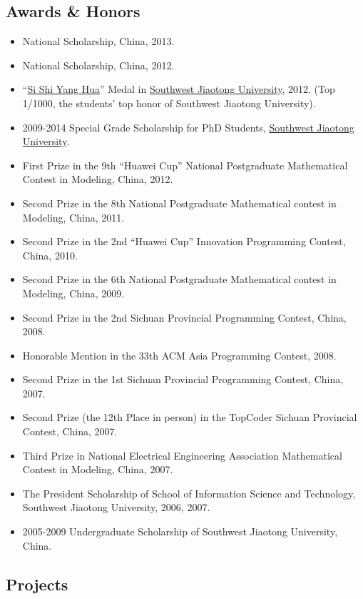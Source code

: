\documentclass[]{article}
\begin{document}
\subsection{Awards \& Honors}\label{awards-honors}

\begin{itemize}
\itemsep1pt\parskip0pt
\item
  National Scholarship, China, 2013.
\item
  National Scholarship, China, 2012.
\item
  ``\href{http://baike.baidu.com/view/644025.htm}{Si Shi Yang Hua}''
  Medal in \href{http://www.swjtu.edu.cn/}{Southwest Jiaotong
  University}, 2012. (Top 1/1000, the students' top honor of Southwest
  Jiaotong University).
\item
  2009-2014 Special Grade Scholarship for PhD Students,
  \href{http://www.swjtu.edu.cn/}{Southwest Jiaotong University}.
\item
  First Prize in the 9th ``Huawei Cup'' National Postgraduate
  Mathematical Contest in Modeling, China, 2012.
\item
  Second Prize in the 8th National Postgraduate Mathematical contest in
  Modeling, China, 2011.
\item
  Second Prize in the 2nd ``Huawei Cup'' Innovation Programming Contest,
  China, 2010.
\item
  Second Prize in the 6th National Postgraduate Mathematical contest in
  Modeling, China, 2009.
\item
  Second Prize in the 2nd Sichuan Provincial Programming Contest, China,
  2008.
\item
  Honorable Mention in the 33th ACM Asia Programming Contest, 2008.
\item
  Second Prize in the 1st Sichuan Provincial Programming Contest, China,
  2007.
\item
  Second Prize (the 12th Place in person) in the TopCoder Sichuan
  Provincial Contest, China, 2007.
\item
  Third Prize in National Electrical Engineering Association
  Mathematical Contest in Modeling, China, 2007.
\item
  The President Scholarship of School of Information Science and
  Technology, Southwest Jiaotong University, 2006, 2007.
\item
  2005-2009 Undergraduate Scholarship of Southwest Jiaotong University,
  China.
\end{itemize}

\subsection{Projects}\label{projects}
\end{document}
